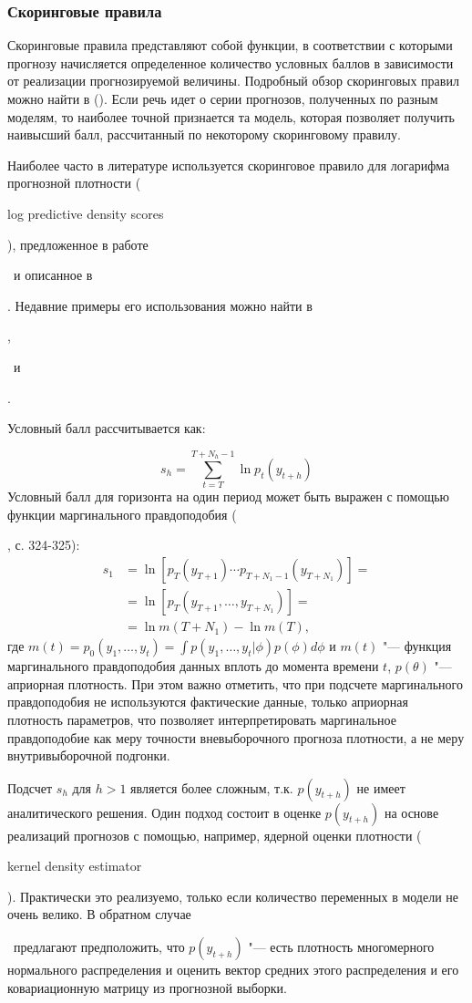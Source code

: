 \documentclass[11pt]{article} %
\newcommand{\eng}[1]{\begin{otherlanguage}{english}#1\end{otherlanguage}}
\begin{document}
\subsubsection{Скоринговые правила}

Скоринговые правила представляют собой функции, в соответствии с которыми прогнозу начисляется определенное количество условных баллов в зависимости от реализации прогнозируемой величины. Подробный обзор скоринговых правил можно найти в (\cite{tsyplakov_2012}). Если речь идет о серии прогнозов, полученных по разным моделям, то наиболее точной признается та модель, которая позволяет получить наивысший балл, рассчитанный по некоторому скоринговому правилу.

Наиболее часто в литературе используется скоринговое правило для логарифма прогнозной плотности (\eng{log predictive density scores}), предложенное в работе \eng{\cite{good_1952}}~и описанное в \eng{\cite{geweke_amisano_2010}}. Недавние примеры его использования можно найти в \eng{\cite{adolfson_al_2007}}, \eng{\cite{christoffel_al_2010}}~и \eng{\cite{carriero_al_2015}}.

Условный балл рассчитывается как:

\begin{equation}
s_h=\sum_{t=T}^{T+N_h-1} \ln p_t(y_{t+h})
\end{equation}
Условный балл для горизонта на один период может быть выражен с помощью функции маргинального правдоподобия (\eng{\cite{adolfson_al_2007}}, с. 324-325):
\begin{align}
s_1 &=\ln [p_T(y_{T+1})\cdots p_{T+N_1-1}(y_{T+N_1})]= \\
&=\ln[p_T(y_{T+1},\ldots,y_{T+N_1})]=\\
&=\ln m(T+N_1)-\ln m(T),
\end{align}
где $m(t)=p_0(y_1,\ldots,y_t)=\int p(y_1,\ldots,y_t|\phi) p(\phi) d\phi$ и $m(t)$ "--- функция маргинального правдоподобия данных вплоть до момента времени $t$, $p(\theta)$ "--- априорная плотность. При этом важно отметить, что при подсчете маргинального правдоподобия не используются фактические данные, только априорная плотность параметров, что позволяет интерпретировать маргинальное правдоподобие как меру точности вневыборочного прогноза плотности, а не меру внутривыборочной подгонки.

Подсчет $s_h$ для $h>1$ является более сложным, т.к. $p(y_{t+h})$ не имеет аналитического решения. Один подход состоит в оценке $p(y_{t+h})$ на основе реализаций прогнозов с помощью, например, ядерной оценки плотности (\eng{kernel density estimator}). Практически это реализуемо, только если количество переменных в модели не очень велико. В обратном случае  \eng{\cite{adolfson_al_2007}}~предлагают предположить, что $p(y_{t+h})$ "--- есть плотность многомерного нормального распределения и оценить вектор средних этого распределения и его ковариационную матрицу из прогнозной выборки.
\end{document}
